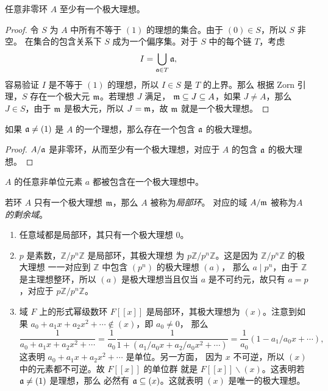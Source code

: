 \begin{theorem}
  任意非零环 $A$ 至少有一个极大理想。
\end{theorem}
\begin{proof}
  令 $S$ 为 $A$ 中所有不等于 $(1)$ 的理想的集合。由于 $(0)\in S$，所以 $S$ 非空。
  在集合的包含关系下 $S$ 成为一个偏序集。对于 $S$ 中的每个链 $T$，考虑
  \[
    I=\bigcup_{\mathfrak{a}\in T}\mathfrak{a} , 
  \]
  容易验证 $I$ 是不等于 $(1)$ 的理想，所以 $I\in S$ 是 $T$ 的上界。那么
  根据 Zorn 引理，$S$ 存在一个极大元 $\mathfrak{m}$。若理想 $J$ 满足，
  $\mathfrak{m}\subseteq J\subseteq A$，如果 $J\neq A$，那么 $J\in S$，由于
  $\mathfrak{m}$ 是极大元，所以 $J=\mathfrak{m}$，故 $\mathfrak{m}$ 就是一个极大理想。
\end{proof}

\begin{corollary}\label{coro:non-zero ideal is contained in a maximal ideal}
  如果 $\mathfrak{a}\neq (1)$ 是 $A$ 的一个理想，那么存在一个包含 $\mathfrak{a}$ 的极大理想。
\end{corollary}
\begin{proof}
  $A/\mathfrak{a}$ 是非零环，从而至少有一个极大理想，对应于 $A$ 的包含 $\mathfrak{a}$ 的极大理想。
\end{proof}

\begin{corollary}
  $A$ 的任意非单位元素 $a$ 都被包含在一个极大理想中。
\end{corollary}

\begin{definition}
  若环 $A$ 只有一个极大理想 $\mathfrak{m}$，那么 $A$ 被称为\emph{局部环}。
  对应的域 $A/\mathfrak{m}$ 被称为\emph{$A$ 的剩余域}。
\end{definition}

\begin{example}
  \mbox{}
  \begin{enumerate}
    \item 任意域都是局部环，其只有一个极大理想 $0$。
    \item $p$ 是素数，$\mathbb{Z}/p^n\mathbb{Z}$ 是局部环，其极大理想
    为 $p\mathbb{Z}/p^n\mathbb{Z}$。这是因为 $\mathbb{Z}/p^n\mathbb{Z}$ 的极大理想
    一一对应到 $\mathbb{Z}$ 中包含 $(p^n)$ 的极大理想 $(a)$，
    那么 $a\mid p^n$，由于 $\mathbb{Z}$ 是主理想整环，所以 $(a)$ 是极大理想当且仅当
    $a$ 是不可约元，故只有 $a=p$，对应于 $p\mathbb{Z}/p^n\mathbb{Z}$。
    \item 域 $F$ 上的形式幂级数环 $F[[x]]$ 是局部环，其极大理想为
    $(x)$。注意到如果 $a_0+a_1x+a_2x^2+\cdots \notin (x)$，即 $a_0\neq 0$，
    那么
    \[
      \frac{1}{a_0+a_1x+a_2x^2+\cdots}  
      =
      \frac{1}{a_0}\frac{1}{1+(a_1/a_0x+a_2/a_0x^2+\cdots)}
      =\frac{1}{a_0}(1-a_1/a_0x+\cdots),
    \]
    这表明 $a_0+a_1x+a_2x^2+\cdots$ 是单位。另一方面，
    因为 $x$ 不可逆，所以 $(x)$ 中的元素都不可逆。故 $F[[x]]$ 的单位群
    就是 $F[[x]]\backslash (x)$。这表明若 $\mathfrak{a}\neq (1)$ 是理想，那么
    必然有 $\mathfrak{a}\subseteq (x)$。这就表明 $(x)$ 是唯一的极大理想。
  \end{enumerate}
\end{example}

